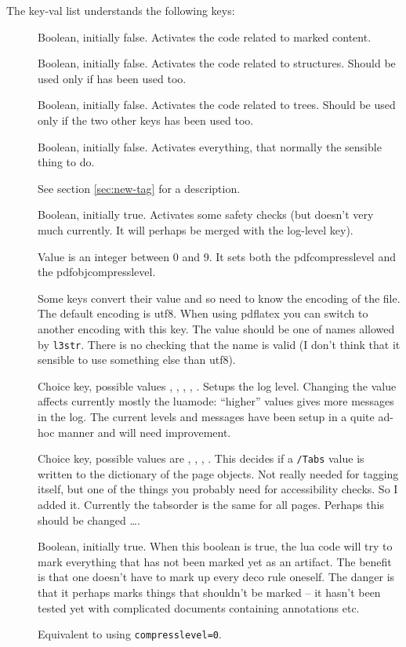 \documentclass[DIV=12,parskip=half-,bibliography=totoc]{scrartcl}
\begin{document}
The key-val list understands the following keys:
\begin{description}
\item[ ] Boolean, initially false. Activates the code related to marked content.
\item[] Boolean, initially false. Activates the code related to structures. Should be used only if  has been used too.
\item[] Boolean, initially false. Activates the code related to trees. Should be used only if the two other keys has been used too.
\item[] Boolean, initially false. Activates everything, that normally the sensible thing to do.
\item[] See section \ref{sec:new-tag} for a description.
\item[] Boolean, initially true. Activates some safety checks (but doesn't very much currently. It will perhaps be merged with the log-level key).
\item[] Value is an integer between 0 and 9. It sets both the pdfcompresslevel and the pdfobjcompresslevel.
\item[]  Some keys convert their value and so need to know the encoding of the file. The default encoding is utf8.  When using pdflatex you can switch to another encoding with this key. The value should be one of names allowed by \texttt{l3str}. There is no checking that the name is valid (I don't think that it sensible to use something else than utf8).
\item[] Choice key, possible values , , , ,  .  Setups the log level.  Changing the value affects currently mostly the luamode: \enquote{higher} values gives more messages in the log. The current levels and messages have been setup in a quite ad-hoc manner and will need improvement.
\item[] Choice key, possible values are , , , .  This decides if a \verb+/Tabs+ value is written to the dictionary of the page objects. Not really needed for tagging itself, but one of the things you probably need for accessibility checks. So I added it. Currently the tabsorder is the same for all pages. Perhaps this should be changed \ldots.
\item[] Boolean, initially true. When this boolean is true, the lua code will try to mark everything that has not been marked yet as an artifact. The benefit is that one doesn't have to mark up every deco rule oneself. The danger is that it perhaps marks things that shouldn't be marked -- it hasn't been tested yet with complicated documents containing annotations etc.
\item[] Equivalent to using \texttt{compresslevel=0}.


\end{description}
\end{document}

